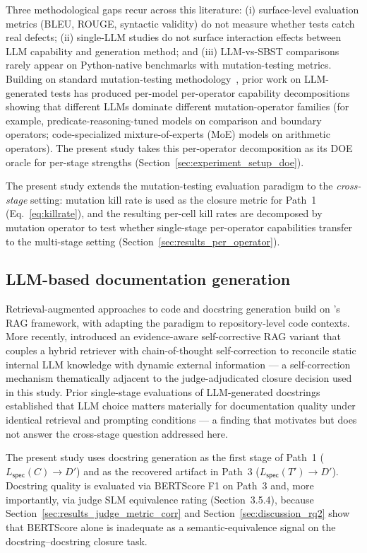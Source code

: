 Three methodological gaps recur across this literature: (i) surface-level evaluation metrics (BLEU, ROUGE, syntactic validity) do not measure whether tests catch real defects; (ii) single-LLM studies do not surface interaction effects between LLM capability and generation method; and (iii) LLM-vs-SBST comparisons rarely appear on Python-native benchmarks with mutation-testing metrics. Building on standard mutation-testing methodology~\citep{Andrews2005MutationAnalysis, Just2014MutationAnalysis}, prior work on LLM-generated tests has produced per-model per-operator capability decompositions showing that different LLMs dominate different mutation-operator families (for example, predicate-reasoning-tuned models on comparison and boundary operators; code-specialized mixture-of-experts (MoE) models on arithmetic operators). The present study takes this per-operator decomposition as its DOE oracle for per-stage strengths (Section~\ref{sec:experiment_setup_doe}).

The present study extends the mutation-testing evaluation paradigm to the \emph{cross-stage} setting: mutation kill rate is used as the closure metric for Path~1 (Eq.~\ref{eq:killrate}), and the resulting per-cell kill rates are decomposed by mutation operator to test whether single-stage per-operator capabilities transfer to the multi-stage setting (Section~\ref{sec:results_per_operator}).

\subsection{LLM-based documentation generation}

Retrieval-augmented approaches to code and docstring generation build on \citet{Lewis2020RAG}'s RAG framework, with \citet{Zhang2023RAGCode} adapting the paradigm to repository-level code contexts. More recently, \citet{Li2026SCRAG} introduced an evidence-aware self-corrective RAG variant that couples a hybrid retriever with chain-of-thought self-correction to reconcile static internal LLM knowledge with dynamic external information --- a self-correction mechanism thematically adjacent to the judge-adjudicated closure decision used in this study. Prior single-stage evaluations of LLM-generated docstrings established that LLM choice matters materially for documentation quality under identical retrieval and prompting conditions --- a finding that motivates but does not answer the cross-stage question addressed here.

The present study uses docstring generation as the first stage of Path~1 ($L_{\textsf{spec}}(C) \to D'$) and as the recovered artifact in Path~3 ($L_{\textsf{spec}}(T') \to D'$). Docstring quality is evaluated via BERTScore F1 on Path~3 and, more importantly, via judge SLM equivalence rating (Section~3.5.4), because Section~\ref{sec:results_judge_metric_corr} and Section~\ref{sec:discussion_rq2} show that BERTScore alone is inadequate as a semantic-equivalence signal on the docstring--docstring closure task.

